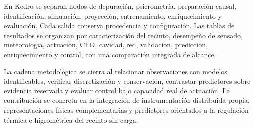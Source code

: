 En Kedro se separan nodos de depuración, psicrometría, preparación causal, identificación, simulación, proyección, entrenamiento, enriquecimiento y evaluación. Cada salida conserva procedencia y configuración. Las tablas de resultados se organizan por caracterización del recinto, desempeño de sensado, meteorología, actuación, CFD, cavidad, red, validación, predicción, enriquecimiento y control, con una comparación integrada de alcance.

La cadena metodológica se cierra al relacionar observaciones con modelos identificables, verificar discretización y conservación, contrastar predictores sobre evidencia reservada y evaluar control bajo capacidad real de actuación. La contribución se concreta en la integración de instrumentación distribuida propia, representaciones físicas complementarias y predictores orientados a la regulación térmica e higrométrica del recinto sin carga.
